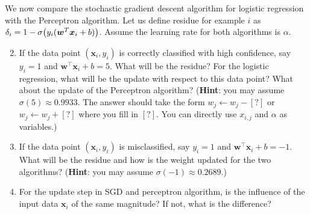 We now compare the stochastic gradient descent algorithm for logistic regression with the Perceptron algorithm. Let us define residue for example $i$ as $\delta_i=1-\sigma\big(y_i(\boldsymbol{w}^T \boldsymbol{x}_i+b)\big)$. Assume the learning rate for both algorithms is $\alpha$.

\begin{enumerate}
\setcounter{enumi}{1}
\item {} If the data point $(\mathbf{x}_i,y_i)$ is correctly classified with high confidence, say $y_i=1$ and $\mathbf{w}^\top\mathbf{x}_i + b = 5$. What will be the residue? For the logistic regression, what will be the update with respect to this data point? What about the update of the Perceptron algorithm? (\textbf{Hint}: you may assume $\sigma(5)\approx 0.9933$. The answer should take the form $w_j\leftarrow w_j-[?]$ or $w_j\leftarrow w_j+[?]$ where you fill in $[?]$. You can directly use $x_{i,j}$ and $\alpha$ as variables.)



\item {} If the data point $(\mathbf{x}_i,y_i)$ is misclassified, say $y_i=1$ and $\mathbf{w}^\top\mathbf{x}_i + b = -1$. What will be the residue and how is the weight updated for the two algorithms? (\textbf{Hint}: you may assume $\sigma(-1)\approx 0.2689$.)



\item {} For the update step in SGD and perceptron algorithm, is the influence of the input data $\mathbf{x}_i$ of the same magnitude? If not, what is the difference?


\end{enumerate}

